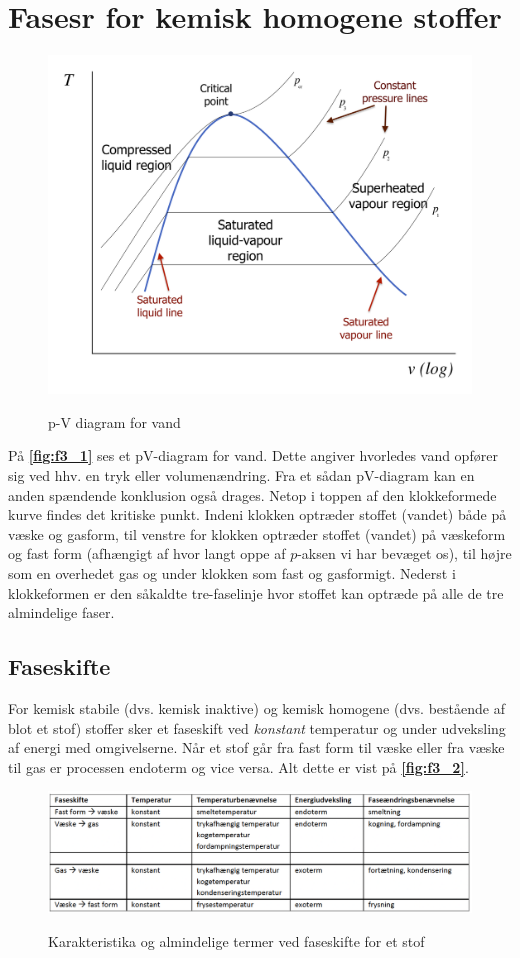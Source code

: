 
\section{Fasesr for kemisk homogene stoffer}

\begin{figure} [ht]
  \centering
  \caption{p-V diagram for vand}
  \includegraphics[width=0.5\linewidth]{./figures/f3_1.png}
  \label{fig:f3_1}
\end{figure}
På \textbf{\autoref{fig:f3_1}} ses et pV-diagram for vand. Dette angiver hvorledes vand opfører sig ved hhv. en tryk eller volumenændring. Fra et sådan pV-diagram kan en anden spændende konklusion også drages. Netop i toppen af den klokkeformede kurve findes det kritiske punkt. Indeni klokken optræder stoffet (vandet) både på væske og gasform, til venstre for klokken optræder stoffet (vandet) på væskeform og fast form (afhængigt af hvor langt oppe af $p$-aksen vi har bevæget os), til højre som en overhedet gas og under klokken som fast og gasformigt. Nederst i klokkeformen er den såkaldte tre-faselinje hvor stoffet kan optræde på alle de tre almindelige faser. 

\subsection{Faseskifte}
For kemisk stabile (dvs. kemisk inaktive) og kemisk homogene (dvs. bestående af blot et stof) stoffer sker et faseskift ved \textit{konstant} temperatur og under udveksling af energi med omgivelserne. Når et stof går fra fast form til væske eller fra væske til gas er processen endoterm og vice versa. Alt dette er vist på \textbf{\autoref{fig:f3_2}}.
\begin{figure} [ht]
  \centering
  \caption{Karakteristika og almindelige termer ved faseskifte for et stof}
  \includegraphics[width=0.5\linewidth]{./figures/f3_2.png}
  \label{fig:f3_2}
\end{figure}

